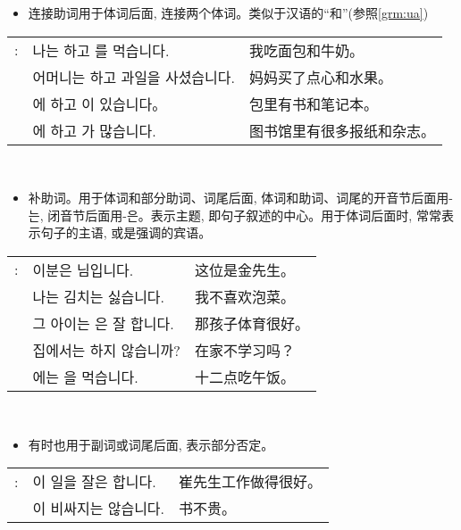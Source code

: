 \begin{grammar}
	\begin{grammarsect}[\kr -하고]\label{grm:hako}
		\begin{itemize}
			\item 连接助词用于体词后面, 连接两个体词。类似于汉语的“和”(参照\ref{grm:ua})
		\end{itemize}
		\begin{tabular}{lll}
			\kr \ruby{例}{예}: & \kr 나는 \ruby{빵}{pão}하고 \ruby{牛乳}{우유}를 먹습니다.               & 我吃面包和牛奶。      \\
			                 & \kr 어머니는 \ruby{菓子}{과자}하고 과일을 사셨습니다.                       & 妈妈买了点心和水果。    \\
			                 & \kr \ruby{가방}{かばん}에 \ruby{冊}{책}하고 \ruby{空冊}{공책}이 있습니다。    & 包里有书和笔记本。     \\
			                 & \kr \ruby{圖書館}{도서관}에 \ruby{新聞}{신문}하고 \ruby{雜誌}{잡지}가 많습니다. & 图书馆里有很多报纸和杂志。 \\
		\end{tabular}\\
	\end{grammarsect}
	\begin{grammarsect}[\kr -은 / -는]
		\begin{itemize}
			\item 补助词。用于体词和部分助词、词尾后面, 体词和助词、词尾的开音节后面用{\kr -는}, 闭音节后面用{\kr -은}。表示主题, 即句子叙述的中心。用于体词后面时, 常常表示句子的主语, 或是强调的宾语。
		\end{itemize}
		\begin{tabular}{lll}
			\kr \ruby{例}{예}: & \kr 이분은 \ruby{金}{김} \ruby{先生}{선생}님입니다.                & 这位是金先生。  \\
			                 & \kr 나는 김치는 싫습니다.                                      & 我不喜欢泡菜。  \\
			                 & \kr 그 아이는 \ruby{運動}{운동}은 잘 합니다.                       & 那孩子体育很好。 \\
			                 & \kr 집에서는 \ruby{工夫}{공부}하지 않습니까?                        & 在家不学习吗？  \\
			                 & \kr \ruby{12}{열두}\ruby{時}{시}에는 \ruby{點心}{점심}을 먹습니다. & 十二点吃午饭。
		\end{tabular}\\
		\begin{itemize}
			\item 有时也用于副词或词尾后面, 表示部分否定。
		\end{itemize}
		\begin{tabular}{lll}
			\kr \ruby{例}{예}: & \kr \ruby{崔}{최} \ruby{先生}{선생}이 일을 잘은 합니다. & 崔先生工作做得很好。 \\
			                 & \kr \ruby{冊}{책}이 비싸지는 않습니다.               & 书不贵。
		\end{tabular}\\
	\end{grammarsect}
\end{grammar}
